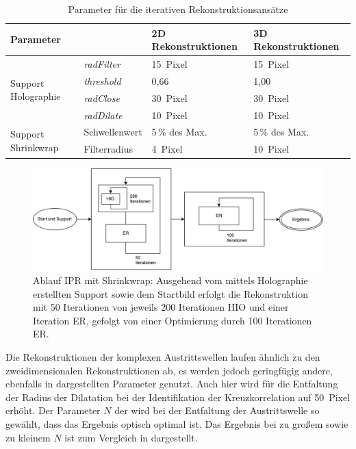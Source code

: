 \begin{table}[]
	\centering
	\caption{Parameter für die iterativen Rekonstruktionsansätze}
	\label{tab:param}
	\begin{tabular}{llll}
		\hline
		\multicolumn{2}{l}{Parameter} &2D Rekonstruktionen&3D Rekonstruktionen\\ 
		\hline
		\multirow{4}{*}{Support Holographie}&\textit{radFilter} & \SI{15}{Pixel} & \SI{15}{Pixel}\\
											&\textit{threshold} & 0,66           & 1,00\\
											&\textit{radClose}  & \SI{30}{Pixel} & \SI{30}{Pixel}\\
											&\textit{radDilate} & \SI{10}{Pixel} & \SI{10}{Pixel}\\
		\hline
		\multirow{2}{*}{Support Shrinkwrap}			&Schwellenwert      & 5\,\% des Max. & 5\,\% des Max.\\
											&Filterradius       & \SI{4}{Pixel}  & \SI{10}{Pixel}\\                
		\hline
	\end{tabular}
\vspace{1cm}
\end{table}




\begin{figure}
	\centering
	\includegraphics[width=.8\textwidth]{images/flow_holo.pdf}
	\caption[Ablauf IPR mit Holographie]{Ablauf IPR mit Shrinkwrap: Ausgehend vom mittels Holographie erstellten Support sowie dem Startbild erfolgt die Rekonstruktion mit 50 Iterationen von jeweils 200 Iterationen HIO und einer Iteration ER, gefolgt von einer Optimierung durch 100 Iterationen ER.}
	\label{fig:flow_holo}
\end{figure} 

\FloatBarrier

Die Rekonstruktionen der komplexen Austrittswellen laufen ähnlich zu den zweidimensionalen Rekonstruktionen ab, es werden jedoch geringfügig andere, ebenfalls in  dargestellten Parameter genutzt. Auch hier wird für die Entfaltung der Radius der Dilatation bei der Identifikation der Kreuzkorrelation auf \SI{50}{Pixel} erhöht. Der Parameter $N$ der wird bei der Entfaltung der Austrittswelle so gewählt, dass das Ergebnis optisch optimal ist. Das Ergebnis bei zu großem sowie zu kleinem $N$ ist zum Vergleich in  dargestellt.

